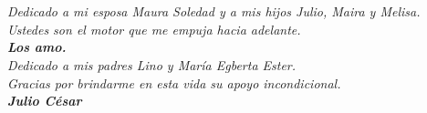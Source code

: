 \chapter*{}
\begin{flushright}
	\textit{Dedicado a mi esposa Maura Soledad y a mis hijos Julio, Maira y Melisa. \\Ustedes son el motor que me empuja hacia adelante.\\ \textbf{Los amo.}\\
	Dedicado a mis padres Lino y Mar\'ia Egberta Ester. \\Gracias por brindarme en esta vida su apoyo incondicional.\\
	\textbf{Julio C\'esar}}
\end{flushright}

